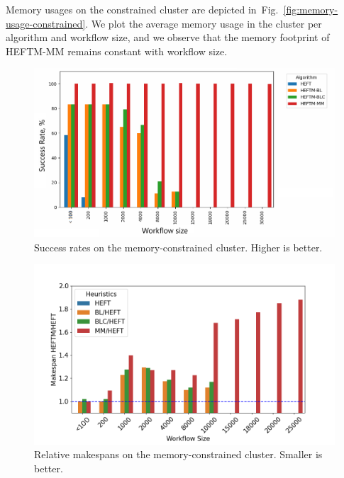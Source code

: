 \documentclass[conference]{IEEEtran}
\newcommand{\algo}[1]{\textsc{#1}}
\newcommand{\heftmm}{\algo{HEFTM-MM}\xspace}
\newcommand{\new}[1]{{\color{blue}#1}}
\begin{document}
%
%
%

Memory usages on the constrained cluster are depicted in~Fig.~\ref{fig:memory-usage-constrained}.
\new{We plot the average memory usage in the cluster per algorithm and workflow size},
and we observe that the memory footprint of \heftmm remains constant with workflow size.


\begin{figure}[tb]
    \centering
    \includegraphics[width=1\columnwidth] {images/success-rates-tiny}
    \caption{Success rates on the memory-constrained cluster. Higher is better. }
    \label{fig:success-rates-tiny}
\end{figure}


\begin{figure}[tb]
    \centering
    \includegraphics[width=1\columnwidth] {images/ms_relations_by_wf_size-constrained-barplot}
    \caption{Relative makespans on the memory-constrained cluster.
    Smaller is better.}
    \label{fig:ms-relations-by-workflow-constrained}
\end{figure}
\end{document}
